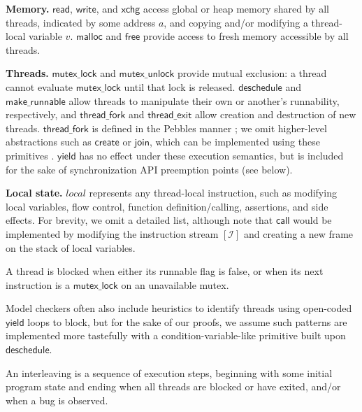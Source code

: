 {\bf Memory.} $\mathsf{read}$, $\mathsf{write}$, and $\mathsf{xchg}$ access global or heap memory shared by all threads, indicated by some address $a$, and copying and/or modifying a thread-local variable $v$. %
$\mathsf{malloc}$ and $\mathsf{free}$ provide access to fresh memory accessible by all threads. %

{\bf Threads.} $\mathsf{mutex\_lock}$ and
$\mathsf{mutex\_unlock}$ provide mutual exclusion:
a thread cannot evaluate $\mathsf{mutex\_lock}$ until that lock is released.
$\mathsf{deschedule}$ and $\mathsf{make\_runnable}$ allow threads to manipulate their own or another's runnability, respectively,
and $\mathsf{thread\_fork}$ and $\mathsf{thread\_exit}$ allow creation and destruction of new threads.
$\mathsf{thread\_fork}$ is defined in the Pebbles manner \cite{kspec};
we omit higher-level abstractions such as $\mathsf{create}$ or $\mathsf{join}$, which can be implemented using these primitives \cite{thrlib}.
$\mathsf{yield}$ has no effect under these execution semantics, but is included for the sake of synchronization API preemption points (see below).

{\bf Local state.}
$\textit{local}$ represents any thread-local instruction, such as modifying local variables, flow control, function definition/calling, assertions, and side effects.
For brevity, we omit a detailed list, although note that $\mathsf{call}$ would be implemented by modifying the instruction stream $[\mathcal{I}]$ and creating a new frame on the stack of local variables.

\begin{definition}
	A thread is blocked when either its runnable flag is false, or when its next instruction is a $\mathsf{mutex\_lock}$ on an unavailable mutex.
\end{definition}

Model checkers often also include heuristics to identify threads using open-coded $\mathsf{yield}$ loops to block,
but for the sake of our proofs, we assume such patterns are implemented more tastefully with a condition-variable-like primitive built upon $\mathsf{deschedule}$.

\begin{definition}[Interleaving]
	An interleaving is a sequence of execution steps, beginning with some initial program state and ending when all threads are blocked or have exited, and/or when a bug is observed.
\end{definition}

